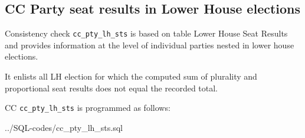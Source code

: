 \subsection{CC Party seat results in Lower House elections}\label{cc_pty_lh_sts}
Consistency check \texttt{\footnotesize cc\_pty\_lh\_sts} is based on table Lower House Seat Results and provides information at the level of individual parties nested in lower house elections.

It enlists all LH election for which the computed sum of plurality and proportional seat results does not equal the recorded total.

CC \texttt{\footnotesize cc\_pty\_lh\_sts} is programmed as follows:

%
{../SQL-codes/cc_pty_lh_sts.sql}

